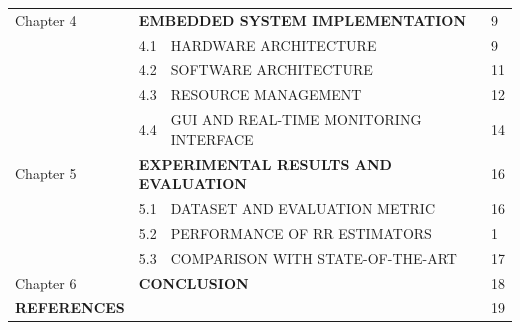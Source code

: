 \documentclass[12pt,a4paper]{report}
\begin{document}
\begin{table}[h]
\begin{tabular}{lllll}
Chapter 4      & \multicolumn{3}{l}{\bf EMBEDDED SYSTEM IMPLEMENTATION}    & 9       \\[1pt]
\vspace{0.2cm}
                & 4.1       & \multicolumn{2}{l}{HARDWARE ARCHITECTURE}                      & 9
                \\[1pt]
                \vspace{0.3cm}
                & 4.2       & \multicolumn{2}{l}{SOFTWARE ARCHITECTURE}   & 11      \\[1pt]
                \vspace{0.3cm}
                & 4.3       & \multicolumn{2}{l}{RESOURCE MANAGEMENT}   & 12      \\[1pt]
                \vspace{0.3cm}
                & 4.4       & \multicolumn{2}{l}{GUI AND REAL-TIME MONITORING INTERFACE}   & 14      \\[1pt]
                \vspace{0.3cm}
                
Chapter 5      & \multicolumn{3}{l}{\bf EXPERIMENTAL RESULTS AND EVALUATION}
                   & 16     \\[1pt]
\vspace{0.3cm}
                & 5.1       & \multicolumn{2}{l}{DATASET AND EVALUATION METRIC }                      & 16
                \\[1pt]
                \vspace{0.3cm}
                & 5.2       & \multicolumn{2}{l}{PERFORMANCE OF RR ESTIMATORS}   & 1      \\[1pt]
                \vspace{0.3cm}
                & 5.3       & \multicolumn{2}{l}{COMPARISON WITH STATE-OF-THE-ART}                      & 17
                \\[1pt]
                \vspace{0.3cm}
               
                
 Chapter 6      & \multicolumn{3}{l}{\bf CONCLUSION}                                    & 18      \\[1pt]
\vspace{0.3cm}               
                
       
\bf REFERENCES      & \multicolumn{3}{l}{}                                              & 19 
\vspace{0.3cm}
\end{tabular}
\end{table}
\end{document}
